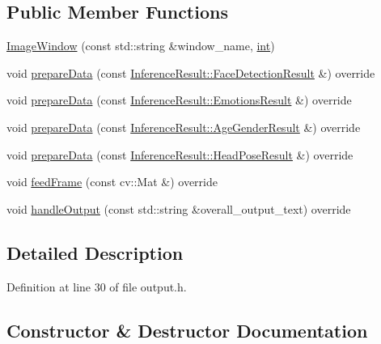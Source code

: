 \subsection*{Public Member Functions}
\begin{DoxyCompactItemize}
\item 
\hyperlink{classImageWindow_a5594e0624586cf492d52ee353348fa6d}{Image\+Window} (const std\+::string \&window\+\_\+name, \hyperlink{CMakeCache_8txt_a79a3d8790b2588b09777910863574e09}{int})
\item 
void \hyperlink{classImageWindow_a26fa3309cf79914dfe09b3b42b85e49e}{prepare\+Data} (const \hyperlink{structInferenceResult_1_1FaceDetectionResult}{Inference\+Result\+::\+Face\+Detection\+Result} \&) override
\item 
void \hyperlink{classImageWindow_a4fdaf7f1728e60672c22ddf57a4071b1}{prepare\+Data} (const \hyperlink{structInferenceResult_1_1EmotionsResult}{Inference\+Result\+::\+Emotions\+Result} \&) override
\item 
void \hyperlink{classImageWindow_a09a86f7b0c0e0eec807a4e1458a057c1}{prepare\+Data} (const \hyperlink{structInferenceResult_1_1AgeGenderResult}{Inference\+Result\+::\+Age\+Gender\+Result} \&) override
\item 
void \hyperlink{classImageWindow_abb0b9b0c103ec0460a2cbeee414b53c4}{prepare\+Data} (const \hyperlink{structInferenceResult_1_1HeadPoseResult}{Inference\+Result\+::\+Head\+Pose\+Result} \&) override
\item 
void \hyperlink{classImageWindow_a802e96acaba82b2f83eb3184c702fbcc}{feed\+Frame} (const cv\+::\+Mat \&) override
\item 
void \hyperlink{classImageWindow_a2927e0003c1f4579fb59aff50a9c7de3}{handle\+Output} (const std\+::string \&overall\+\_\+output\+\_\+text) override
\end{DoxyCompactItemize}


\subsection{Detailed Description}


Definition at line 30 of file output.\+h.



\subsection{Constructor \& Destructor Documentation}
